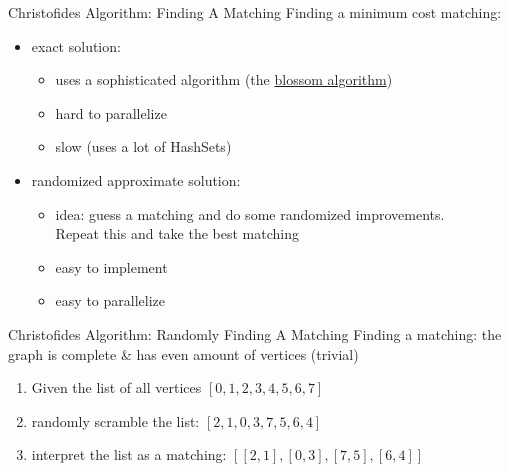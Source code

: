 \begin{frame}[t]{Christofides Algorithm: Finding A Matching}
  Finding a minimum cost matching:
  \begin{itemize}
    \item exact solution:
      \begin{itemize}
        \item uses a sophisticated algorithm (the \href{https://en.wikipedia.org/wiki/Blossom_algorithm}{blossom algorithm})
        \item hard to parallelize
        \item slow (uses a lot of HashSets)
      \end{itemize}
      \pause
    \item randomized approximate solution:
      \begin{itemize}
        \item idea: guess a matching and do some randomized improvements.\\Repeat this and take the best matching
        \item easy to implement
        \item easy to parallelize
      \end{itemize}
  \end{itemize}
\end{frame}

\begin{frame}[t]{Christofides Algorithm: Randomly Finding A Matching}
  \vfill
  Finding a matching: the graph is complete \& has even amount of vertices (trivial)

  \begin{enumerate}
    \item Given the list of all vertices $[0,1,2,3,4,5,6,7]$
    \item randomly scramble the list: $[2,1,0,3,7,5,6,4]$
    \item interpret the list as a matching: $[[2,1],[0,3],[7,5],[6,4]]$
  \end{enumerate}
  \vfill
\end{frame}

